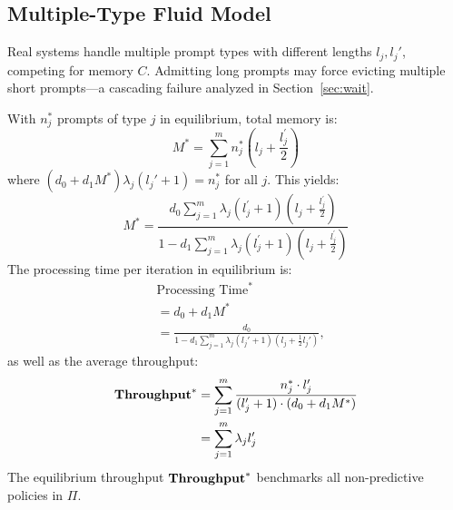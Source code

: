 \subsection{Multiple-Type Fluid Model}
Real systems handle multiple prompt types with different lengths $l_j, l_j'$, competing for memory $C$. Admitting long prompts may force evicting multiple short prompts---a cascading failure analyzed in Section~\ref{sec:wait}.

With $n_j^*$ prompts of type $j$ in equilibrium, total memory is:
\begin{equation}
\label{eq:memory_multi1}
    M^* = \sum_{j=1}^m n_j^*\left(l_j + \frac{l_j^\prime}{2}\right)
\end{equation}
where $(d_0+d_1M^*)\lambda_j(l_j'+1) = n_j^*$ for all $j$. This yields:
\begin{equation}
\label{eq:memory_multi2}
M^* = \frac{d_0\sum_{j=1}^m \lambda_j (l_j^{\prime}+1)\left(l_j + \tfrac{l_j^{\prime}}{2} \right)}{1-d_1\sum_{j=1}^m \lambda_j (l_j^{\prime}+1)\left(l_j + \tfrac{l_j^{\prime}}{2} \right) } 
\end{equation}
The processing time per iteration in equilibrium is:
\begin{equation}    \label{eq:time_fluid}
    \begin{aligned}
            &\text{Processing Time}^* \\&= d_0 + d_1 M^*  \\
                  &= \frac{d_0}{1 - d_1 \sum_{j=1}^m \lambda_j (l_j' + 1)(l_j + \tfrac{1} {2}l_j')},
    \end{aligned}
\end{equation}
as well as the average throughput:
\begin{equation}
    \label{throughput_fluid_multiple}
    \begin{aligned}
        \textbf{Throughput}^*
        &= \sum_{j=1}^m \frac{n_j^* \cdot l_j^{\prime}}{(l_j^{\prime}+1) \cdot (d_0 + d_1 M^*)} \\
        &= \sum_{j=1}^m \lambda_j l_j^{\prime}
    \end{aligned}
\end{equation}
The equilibrium throughput \(\textbf{Throughput}^*\) benchmarks all non-predictive policies in \(\Pi\).

